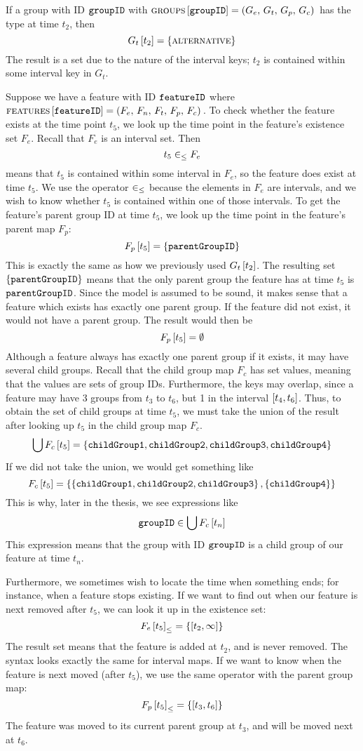 If a group with ID $\texttt{groupID}$ with $\textsc{groups}{} \left[ \texttt{groupID} \right] = \left(G_e,\, G_t,\, G_p,\, G_c\right){}$ has the type \xortype{} at time $t_2$, then
\[
  G_t \left[ t_2 \right] = \left\{\textsc{alternative}{}\right\}
\]
The result is a set due to the nature of the interval keys; $t_2$ is contained within some interval key in $G_t$. 

Suppose we have a feature with ID $\texttt{featureID}$ where $\textsc{features} \left[ \texttt{featureID} \right] = \left(F_e,\, F_n,\, F_t,\, F_p,\, F_c\right){}$. To check whether the feature exists at the time point $t_5$, we look up the time point in the feature's existence set $F_e$. Recall that $F_e$ is an interval set. Then
\[
  t_5 \in_\leq F_e
\]
means that $t_5$ is contained within some interval in $F_e$, so the feature does exist at time $t_5$. We use the operator $\in_\leq$ because the elements in $F_e$ are intervals, and we wish to know whether $t_5$ is contained within one of those intervals. To get the feature's parent group ID at time $t_5$, we look up the time point in the feature's parent map $F_p$:
\[
  F_p \left[ t_5 \right] = \left\{\texttt{parentGroupID}\right\}
\]
This is exactly the same as how we previously used $G_t \left[ t_2 \right]$. The resulting set $\left\{\texttt{parentGroupID}\right\}$ means that the only parent group the feature has at time $t_5$ is $\texttt{parentGroupID}$. Since the model is assumed to be sound, it makes sense that a feature which exists has exactly one parent group. If the feature did not exist, it would not have a parent group. The result would then be
\[
  F_p \left[ t_5 \right] = \emptyset
\]
Although a feature always has exactly one parent group if it exists, it may have several child groups. Recall that the child group map $F_c$ has set values, meaning that the values are sets of group IDs. Furthermore, the keys may overlap, since a feature may have 3 groups from $t_3$ to $t_6$, but 1 in the interval $\interval{t_4}{t_6}$. Thus, to obtain the set of child groups at time $t_5$, we must take the union of the result after looking up $t_5$ in the child group map $F_c$.
\[
  \bigcup{F_c \left[ t_5 \right]} = \left\{\texttt{childGroup1}, \texttt{childGroup2}, \texttt{childGroup3}, \texttt{childGroup4}\right\}
\]
If we did not take the union, we would get something like
\[
  F_c \left[ t_5 \right] = \left\{\left\{\texttt{childGroup1}, \texttt{childGroup2}, \texttt{childGroup3}\right\},  \left\{\texttt{childGroup4}\right\}\right\}
\]
This is why, later in the thesis, we see expressions like
\[
  \texttt{groupID} \in \bigcup{F_c \left[ t_n \right]}
\]
This expression means that the group with ID $\texttt{groupID}$ is a child group of our feature at time $t_n$.

Furthermore, we sometimes wish to locate the time when something ends; for instance, when a feature stops existing. If we want to find out when our feature is next removed after $t_5$, we can look it up in the existence set:
\[
  \containing{F_e}{t_5} = \set{\interval{t_2}{\forever}}
\]
The result set means that the feature is added at $t_2$, and is never removed. The syntax looks exactly the same for interval maps. If we want to know when the feature is next moved (after $t_5$), we use the same operator with the parent group map:
\[
  \containing{F_p}{t_5} = \set{\interval{t_3}{t_6}}
\]
The feature was moved to its current parent group at $t_3$, and will be moved next at $t_6$.

